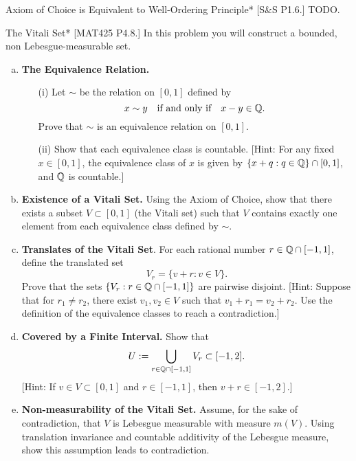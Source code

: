 \begin{problem}{Axiom of Choice is Equivalent to Well-Ordering Principle}*
    [S\&S P1.6.] TODO. 
\end{problem}


\begin{problem}{The Vitali Set}*
    [MAT425 P4.8.] In this problem you will construct a bounded, non Lebesgue-measurable set.

    \begin{enumerate}[(a)]
        \itemsep0em 
        \item \textbf{The Equivalence Relation.}
        \begin{itemize}
            \item[(i)] Let \(\sim\) be the relation on \([0,1]\) defined by
            \[
                x \sim y \quad \text{if and only if} \quad x - y \in \mathbb{Q}.
            \]
            Prove that \(\sim\) is an equivalence relation on \([0,1]\).
            \item[(ii)] Show that each equivalence class is countable. [Hint: For any fixed \(x \in [0,1]\), the equivalence class of \(x\) is given by \(\{x + q : q \in \mathbb{Q} \} \cap [0,1]\), and \(\mathbb{Q}\) is countable.]
        \end{itemize}
        \item \textbf{Existence of a Vitali Set.} Using the Axiom of Choice, show that there exists a subset \(V \subset [0,1]\) (the Vitali set) such that \(V\) contains exactly one element from each equivalence class defined by \(\sim\). 
        \item \textbf{Translates of the Vitali Set}. For each rational number \(r \in \mathbb{Q} \cap [-1,1]\), define the translated set
        \[
            V_r = \{ v + r : v \in V \}.
        \]
        Prove that the sets \(\{V_r : r \in \mathbb{Q} \cap [-1,1]\}\) are pairwise disjoint. [Hint: Suppose that for \(r_1 \ne r_2\), there exist \(v_1, v_2 \in V\) such that \(v_1 + r_1 = v_2 + r_2\). Use the definition of the equivalence classes to reach a contradiction.] 
        \item \textbf{Covered by a Finite Interval.} Show that
        \[
            U := \bigcup_{r \in \mathbb{Q} \cap [-1,1]} V_r \subset [-1,2].
        \]
        [Hint: If \(v \in V \subset [0,1]\) and \(r \in [-1,1]\), then \(v + r \in [-1,2]\).] 
        \item \textbf{Non-measurability of the Vitali Set.} Assume, for the sake of contradiction, that \(V\) is Lebesgue measurable with measure \(m(V)\). Using translation invariance and countable additivity of the Lebesgue measure, show this assumption leads to contradiction.

\end{enumerate}
\end{problem}
